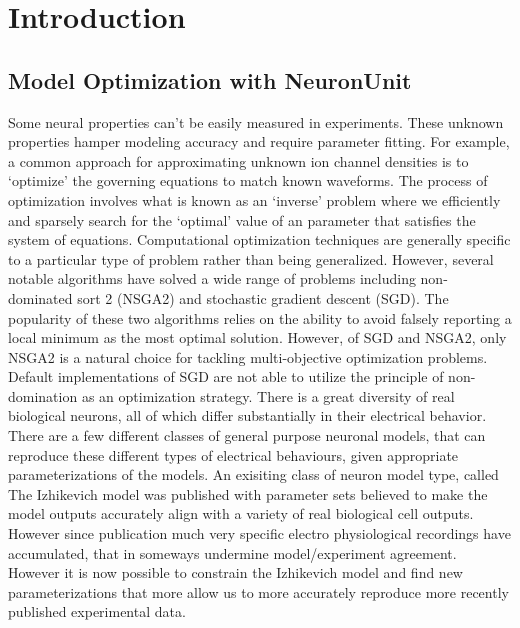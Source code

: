 

\section{Introduction}

\subsection{Model  Optimization with NeuronUnit}
Some neural properties can’t be easily measured in experiments. These unknown properties hamper modeling accuracy and require parameter fitting. For example, a common approach for approximating unknown ion channel densities is to ‘optimize’ the governing equations to match known waveforms. The process of optimization involves what is known as an ‘inverse’ problem where we efficiently and sparsely search for the ‘optimal’ value of an parameter that satisfies the system of equations. Computational optimization techniques are generally specific to a particular type of problem rather than being generalized. However, several notable algorithms have solved a wide range of problems including non-dominated sort 2 (NSGA2) and stochastic gradient descent (SGD). The popularity of these two algorithms relies on the ability to avoid falsely reporting a local minimum as the most optimal solution. However, of SGD and NSGA2, only NSGA2 is a natural choice for tackling multi-objective optimization problems. Default implementations of SGD are not able to utilize the principle of non-domination as an optimization strategy.\newline
\newline
There is a great diversity of real biological neurons, all of which differ substantially in their electrical behavior. There are a few different classes of general purpose neuronal models, that can reproduce these different types of electrical behaviours, given appropriate parameterizations of the models.\newline
\newline
An exisiting class of neuron model type, called The Izhikevich model was published with parameter sets believed to make the model outputs accurately align with a variety of real biological cell outputs. However since publication much very specific electro physiological recordings have accumulated, that in someways undermine model/experiment agreement. However it is now possible to constrain the Izhikevich model and find new parameterizations that more allow us to more accurately reproduce more recently published experimental data.\newline
